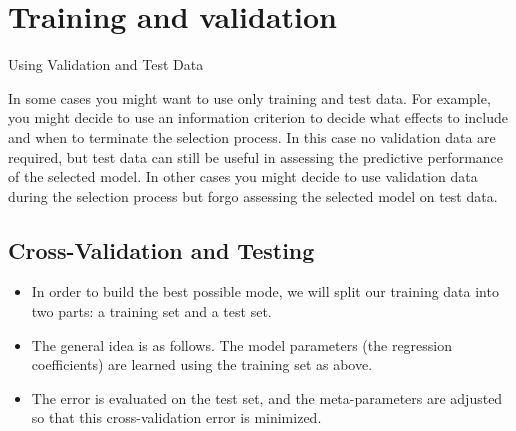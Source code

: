 


\section{Training and validation}
Using Validation and Test Data


In some cases you might want to use only training and test data. For example, you might decide to use an information criterion to decide what effects to include and when to terminate the selection process. In this case no validation data are required, but test data can still be useful in assessing the predictive performance of the selected model. In other cases you might decide to use validation data during the selection process but forgo assessing the selected model on test data. 


\subsection{Cross-Validation and Testing}
\begin{itemize}
	\item In order to build the best possible mode, we will split our training data into two parts: a training set and a test set. 
	
	\item 	The general idea is as follows. The model parameters (the regression coefficients) are learned using the training set as above. 
	\item The error is evaluated on the test set, and the meta-parameters are adjusted so that this cross-validation error is minimized. 

\end{itemize}	
